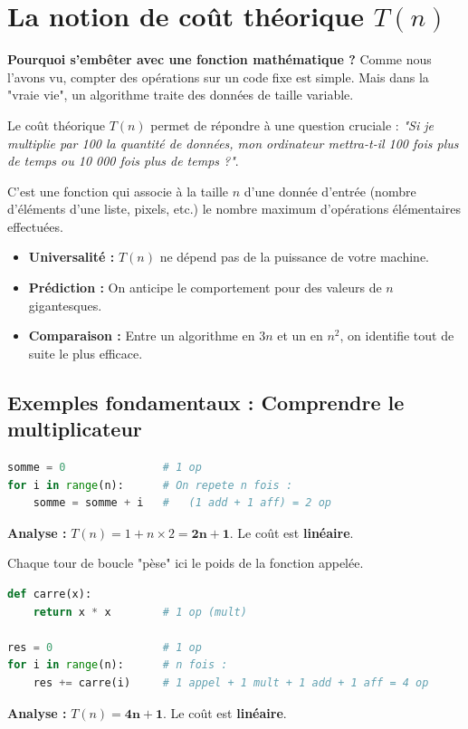 \section*{La notion de coût théorique $T(n)$}

 \textbf{Pourquoi s'embêter avec une fonction mathématique ?}
Comme nous l'avons vu, compter des opérations sur un code fixe est simple. Mais dans la "vraie vie", un algorithme traite des données de taille variable. 

Le coût théorique $T(n)$ permet de répondre à une question cruciale : \textit{"Si je multiplie par 100 la quantité de données, mon ordinateur mettra-t-il 100 fois plus de temps ou 10 000 fois plus de temps ?"}.

\begin{Definition}
C'est une fonction qui associe à la taille $n$ d'une donnée d'entrée (nombre d'éléments d'une liste, pixels, etc.) le nombre maximum d'opérations élémentaires effectuées.
\end{Definition}

\begin{itemize}
    \item \textbf{ Universalité :} $T(n)$ ne dépend pas de la puissance de votre machine.
    \item \textbf{ Prédiction :} On anticipe le comportement pour des valeurs de $n$ gigantesques.
    \item \textbf{ Comparaison :} Entre un algorithme en $3n$ et un en $n^2$, on identifie tout de suite le plus efficace.
\end{itemize}

\subsection*{Exemples fondamentaux : Comprendre le multiplicateur}

\begin{tcolorbox}[colback=blue!5!white,colframe=blue!75!black,title=La boucle simple ]
\begin{lstlisting}[style=pythonstyle, language=python]
somme = 0               # 1 op
for i in range(n):      # On repete n fois :
    somme = somme + i   #   (1 add + 1 aff) = 2 op
\end{lstlisting}
\textbf{Analyse :} $T(n) = 1 + n \times 2 = \mathbf{2n + 1}$. Le coût est \textbf{linéaire}.
\end{tcolorbox}

\begin{tcolorbox}[colback=orange!5!white,colframe=orange!75!black,title=L'appel de fonction ]
Chaque tour de boucle "pèse" ici le poids de la fonction appelée. 
\begin{lstlisting}[style=pythonstyle, language=python]
def carre(x):
    return x * x        # 1 op (mult)

res = 0                 # 1 op
for i in range(n):      # n fois :
    res += carre(i)     # 1 appel + 1 mult + 1 add + 1 aff = 4 op
\end{lstlisting}
\textbf{Analyse :} $T(n) = \mathbf{4n + 1}$. Le coût est \textbf{linéaire}.
\end{tcolorbox}

